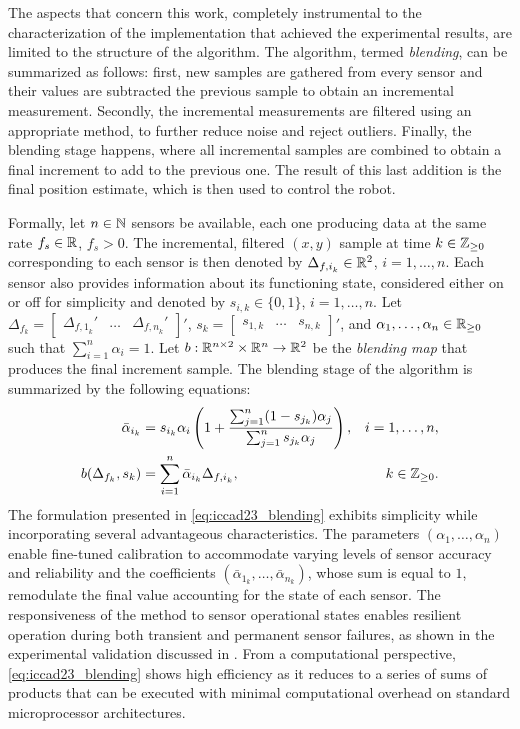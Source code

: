 The aspects that concern this work, completely instrumental to the characterization of the implementation that achieved the experimental results, are limited to the structure of the algorithm. The algorithm, termed \emph{blending}, can be summarized as follows: first, new samples are gathered from every sensor and their values are subtracted the previous sample to obtain an incremental measurement. Secondly, the incremental measurements are filtered using an appropriate method, to further reduce noise and reject outliers. Finally, the blending stage happens, where all incremental samples are combined to obtain a final increment to add to the previous one. The result of this last addition is the final position estimate, which is then used to control the robot.

Formally, let $n\in\mathbb{N}$ sensors be available, each one producing data at the same rate $f_s\in\mathbb{R}$, $f_s>0$. The incremental, filtered $(x,y)$ sample at time $k\in\mathbb{Z}_{\geq 0}$ corresponding to each sensor is then denoted by $\Delta_{{f,i}_k}\in\mathbb{R}^2$, $i=1,\dotsc,n$. Each sensor also provides information about its functioning state, considered either on or off for simplicity and denoted by $s_{i,k}\in\{0,1\}$, $i=1,\dotsc,n$. Let $\Delta_{f_k} = \begin{bmatrix}\Delta_{{f,1}_k}' & \dotsc & \Delta_{{f,n}_k}'\end{bmatrix}'$, $s_k = \begin{bmatrix}s_{1,k} & \dotsc & s_{n,k}\end{bmatrix}'$, and $\alpha_1,\dotsc,\alpha_n\in\mathbb{R}_{\geq 0}$ such that $\sum_{i=1}^n \alpha_i = 1$. Let $b:\mathbb{R}^{n \times 2}\times\mathbb{R}^n\rightarrow\mathbb{R}^2$ be the \emph{blending map} that produces the final increment sample. The blending stage of the algorithm is summarized by the following equations:
\begin{subequations}
  \label{eq:iccad23_blending}
  \begin{align}
    \bar{\alpha}_{i_k} &= s_{i_k}\alpha_i\left(1 + \frac{\sum_{j=1}^{n} (1-s_{j_k})\alpha_j}{\sum_{j=1}^{n}s_{j_k}\alpha_j}\right), & i = 1,\dotsc,n,\\
    b(\Delta_{f_k},s_k) &= \sum_{i=1}^{n} \bar{\alpha}_{i_k}\Delta_{{f,i}_k}, & k\in\mathbb{Z}_{\geq 0}.
  \end{align}
\end{subequations}
The formulation presented in \eqref{eq:iccad23_blending} exhibits simplicity while incorporating several advantageous characteristics. The parameters $(\alpha_1,\dotsc,\alpha_n)$ enable fine-tuned calibration to accommodate varying levels of sensor accuracy and reliability and the coefficients $(\bar{\alpha}_{1_k},\dotsc,\bar{\alpha}_{n_k})$, whose sum is equal to $1$, remodulate the final value accounting for the state of each sensor. The responsiveness of the method to sensor operational states enables resilient operation during both transient and permanent sensor failures, as shown in the experimental validation discussed in \cite{bianchi_efficient_2023}. From a computational perspective, \eqref{eq:iccad23_blending} shows high efficiency as it reduces to a series of sums of products that can be executed with minimal computational overhead on standard microprocessor architectures.

